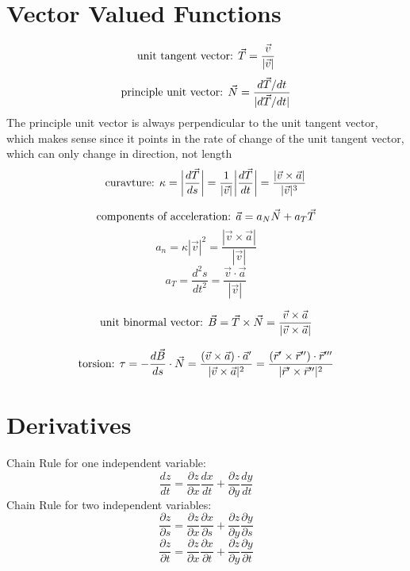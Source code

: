 \documentclass{article}
\begin{document}
\section{Vector Valued Functions}
$$\textnormal{unit tangent vector: } \vec{T} = \frac{\vec{v}}{|\vec{v}|}$$
$$\textnormal{principle unit vector: } \vec{N} = \frac{d\vec{T}/dt}{|d\vec{T}/dt|}$$
The principle unit vector is always perpendicular to the unit tangent vector, which makes sense since it points in the rate of change of the unit tangent vector, which can only change in direction, not length
$$\textnormal{curavture: } \kappa = \bigg |\frac{d\vec{T}}{ds} \bigg | = \frac{1}{|\vec{v}|} \bigg | \frac{d\vec{T}}{dt} \bigg | = \frac{|\vec{v} \times \vec{a} |}{ |\vec{v}|^3}$$

$$\textnormal{components of acceleration: } \vec{a} = a_N \vec{N} + a_T \vec{T}$$
$$a_n = \kappa |\vec{v}|^2 = \frac{|\vec{v} \times \vec{a}|}{|\vec{v}|}$$
$$a_T = \frac{d^2 s}{dt^2} = \frac{\vec{v} \cdot \vec{a}}{|\vec{v}|}$$

$$\textnormal{unit binormal vector: } \vec{B} = \vec{T} \times \vec{N} = \frac{\vec{v} \times \vec{a}}{|\vec{v} \times \vec{a}|}$$

$$\textnormal{torsion: } \tau = - \frac{d\vec{B}}{ds} \cdot \vec{N} = \frac{(\vec{v} \times \vec{a}) \cdot \vec{a}'}{|\vec{v} \times \vec{a}|^2} = \frac{(\vec{r}' \times \vec{r}'') \cdot \vec{r}'''}{|\vec{r}' \times \vec{r}''|^2}$$

\section{Derivatives}
Chain Rule for one independent variable:
$$\frac{dz}{dt} = \frac{\partial z}{\partial x} \frac{dx}{dt} + \frac{\partial z}{\partial y} \frac{dy}{dt}$$
Chain Rule for two independent variables:
$$\frac{\partial z}{\partial s} = \frac{\partial z}{\partial x} \frac{\partial x}{\partial s} + \frac{\partial z}{\partial y}\frac{\partial y}{\partial s}$$
$$\frac{\partial z}{\partial t} = \frac{\partial z}{\partial x} \frac{\partial x}{\partial t} + \frac{\partial z}{\partial y}\frac{\partial y}{\partial t}$$
\end{document}
